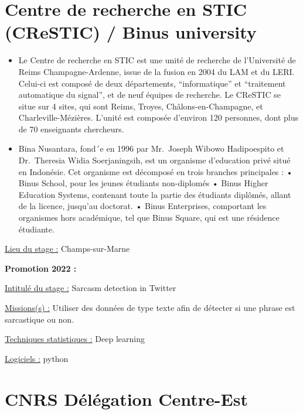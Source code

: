 \documentclass[
  letterpaper,
  DIV=11,
  numbers=noendperiod]{scrreprt}
\begin{document}
\hypertarget{centre-de-recherche-en-stic-crestic-binus-university}{%
\section{\texorpdfstring{\textbf{Centre de recherche en STIC (CReSTIC) /
Binus
university}}{Centre de recherche en STIC (CReSTIC) / Binus university}}\label{centre-de-recherche-en-stic-crestic-binus-university}}

\begin{itemize}
\item
  Le Centre de recherche en STIC est une unité de recherche de
  l'Université de Reims Champagne-Ardenne, issue de la fusion en 2004 du
  LAM et du LERI. Celui-ci est composé de deux départements,
  ``informatique'' et ``traitement automatique du signal'', et de neuf
  équipes de recherche. Le CReSTIC se situe sur 4 sites, qui sont Reims,
  Troyes, Châlons-en-Champagne, et Charleville-Mézières. L'unité est
  composée d'environ 120 personnes, dont plus de 70 enseignants
  chercheurs.
\item
  Bina Nusantara, fond´e en 1996 par Mr.~Joseph Wibowo Hadipoespito et
  Dr.~Theresia Widia Soerjaningsih, est un organisme d'education privé
  situé en Indonésie. Cet organisme est décomposé en trois branches
  principales : • Binus School, pour les jeunes étudiants non-diplomés •
  Binus Higher Education Systems, contenant toute la partie des
  étudiants diplômés, allant de la licence, jusqu'au doctorat. • Binus
  Enterprises, comportant les organismes hors académique, tel que Binus
  Square, qui est une résidence étudiante.
\end{itemize}

\uline{Lieu du stage :} Champs-sur-Marne

\textbf{Promotion 2022 :}

\uline{Intitulé du stage :} Sarcasm detection in Twitter

\uline{Missions(s) :} Utiliser des données de type texte afin de
détecter si une phrase est sarcastique ou non.

\uline{Techniques statistiques :} Deep learning

\uline{Logiciels :} python

\hypertarget{cnrs-duxe9luxe9gation-centre-est}{%
\section{CNRS Délégation
Centre-Est}\label{cnrs-duxe9luxe9gation-centre-est}}
\end{document}
